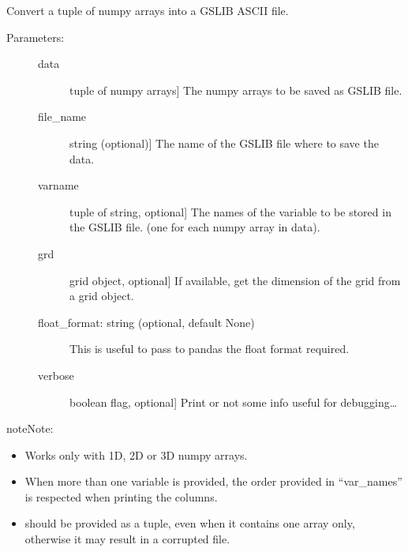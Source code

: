 \documentclass[letterpaper,10pt,english]{sphinxmanual}
\begin{document}
\begin{fulllineitems}
\label{\detokenize{appendices:s2Dcd.gslibnumpy.numpy2gslib}}
Convert a tuple of numpy arrays into a GSLIB ASCII file.
\begin{description}
\item[{Parameters:}] \leavevmode\begin{description}
\item[{data}] \leavevmode{[}tuple of numpy arrays{]}
The numpy arrays to be saved as GSLIB file.

\item[{file\_name}] \leavevmode{[}string (optional){]}
The name of the GSLIB file where to save the data.

\item[{varname}] \leavevmode{[}tuple of string, optional{]}
The names of the variable to be stored in the GSLIB file.
(one for each numpy array in data).

\item[{grd}] \leavevmode{[}grid object, optional{]}
If available, get the dimension of the grid from a grid object.

\item[{float\_format: string (optional, default None)}] \leavevmode
This is useful to pass to pandas  the float format required.

\item[{verbose}] \leavevmode{[}boolean flag, optional{]}
Print or not some info useful for debugging…

\end{description}

\end{description}

\begin{sphinxadmonition}{note}{Note:}\begin{itemize}
\item {} 
Works only with 1D, 2D or 3D numpy arrays.

\item {} 
When more than one variable is provided, the order provided
in “var\_names” is respected when printing the columns.

\item {} 
 should be  provided as a tuple, even when
it contains one array only, otherwise it may result in a corrupted
file.

\end{itemize}
\end{sphinxadmonition}

\end{fulllineitems}
\end{document}
